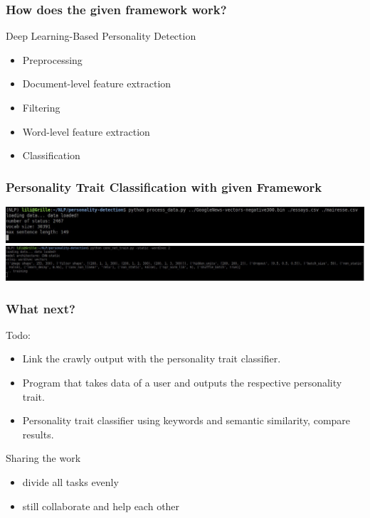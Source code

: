 \documentclass{beamer}
\begin{document}
	\begin{frame}
\frametitle{How does the given framework work?}
Deep Learning-Based Personality Detection\cite{traitpaper}
\begin{itemize}
	\item Preprocessing
	\item Document-level feature extraction
	\item Filtering
	\item Word-level feature extraction
	\item Classification
\end{itemize}
\end{frame}


	\begin{frame}
		\frametitle{Personality Trait Classification with given Framework}
		\includegraphics[width=\textwidth]{pictures/output3}
		\includegraphics[width=\textwidth]{pictures/output1}		
	\end{frame}

	\begin{frame}
		\frametitle{What next?}
		Todo:
		\begin{itemize}
			\item Link the crawly output with the personality trait classifier.
			\item Program that takes data of a user and outputs the respective personality trait.
			\item Personality trait classifier using keywords and semantic similarity, compare results.
		\end{itemize}
	
		Sharing the work
		\begin{itemize}
			\item divide all tasks evenly
			\item still collaborate and help each other
		\end{itemize}
	\end{frame}
\end{document}
